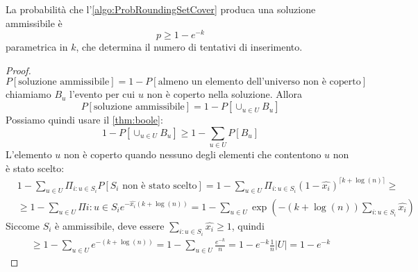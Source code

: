 \begin{theorem}
	La probabilità che l'\cref{algo:ProbRoundingSetCover} produca una soluzione ammissibile è
	$$
		p \geq 1 - e ^ {-k}
	$$
	parametrica in $k$, che determina il numero di tentativi di inserimento.
\end{theorem}
\begin{proof}
	$$
		P[\text{soluzione ammissibile}] = 1 - P[\text{almeno un elemento dell'universo non è coperto}]
	$$
	chiamiamo $B_u$ l'evento per cui $u$ non è coperto nella soluzione. Allora
	$$
		P[\text{soluzione ammissibile}] = 1 - P[\cup_{u \in U} B_u]
	$$
	Possiamo quindi usare il \cref{thm:boole}:
	$$
		1 - P[\cup_{u \in U} B_u] \geq 1 - \sum_{u \in U} P[B_u]
	$$
	L'elemento $u$ non è coperto quando nessuno degli elementi che contentono
	$u$ non è stato scelto:
	\begin{align*}
		 & 1 - \sum_{u \in U} \Pi_{i: u \in S_i} P[S_i \text{ non è stato scelto}] =
		1 - \sum_{u \in U} \Pi_{i: u \in S_i} (1 - \hat{x_i})^{\lceil k + \log(n) \rceil} \geq \\
		 & \geq 1 - \sum_{u \in U} \Pi {i : u \in S_i} e^{-\hat{x_i} (k + \log(n))}
		= 1 - \sum_{u \in U} \exp(- (k + \log (n)) \sum_{i: u \in S_i} \hat{x_i})
	\end{align*}
	Siccome $S_i$ è ammissibile, deve essere $\sum_{i: u \in S_i} \hat{x_i}  \geq 1$, quindi
	\begin{align*}
		\geq 1 - \sum_{u \in U} e^{- (k + \log(n))} = 1 - \sum_{u \in U} \frac{e^{-k}}{n}  = 1 - e^{-k} \frac{1}{n}|U| = 1 - e^{-k}
	\end{align*}
\end{proof}

